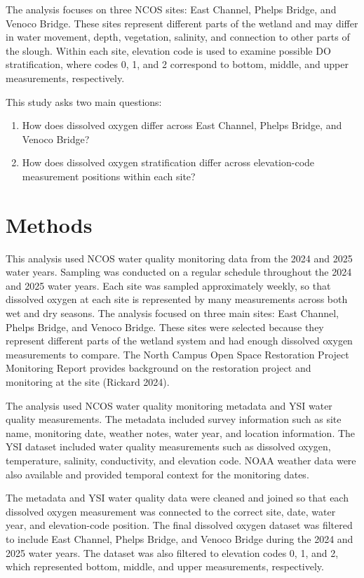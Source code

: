 \documentclass[
  letterpaper,
  DIV=11,
  numbers=noendperiod]{scrartcl}
\providecommand{\tightlist}{%
  \setlength{\itemsep}{0pt}\setlength{\parskip}{0pt}}
\begin{document}
The analysis focuses on three NCOS sites: East Channel, Phelps Bridge,
and Venoco Bridge. These sites represent different parts of the wetland
and may differ in water movement, depth, vegetation, salinity, and
connection to other parts of the slough. Within each site, elevation
code is used to examine possible DO stratification, where codes 0, 1,
and 2 correspond to bottom, middle, and upper measurements,
respectively.

This study asks two main questions:

\begin{enumerate}
\def\labelenumi{\arabic{enumi}.}
\tightlist
\item
  How does dissolved oxygen differ across East Channel, Phelps Bridge,
  and Venoco Bridge?
\item
  How does dissolved oxygen stratification differ across elevation-code
  measurement positions within each site?
\end{enumerate}

\section{Methods}\label{methods}

This analysis used NCOS water quality monitoring data from the 2024 and
2025 water years. Sampling was conducted on a regular schedule
throughout the 2024 and 2025 water years. Each site was sampled
approximately weekly, so that dissolved oxygen at each site is
represented by many measurements across both wet and dry seasons. The
analysis focused on three main sites: East Channel, Phelps Bridge, and
Venoco Bridge. These sites were selected because they represent
different parts of the wetland system and had enough dissolved oxygen
measurements to compare. The North Campus Open Space Restoration Project
Monitoring Report provides background on the restoration project and
monitoring at the site (Rickard 2024).

The analysis used NCOS water quality monitoring metadata and YSI water
quality measurements. The metadata included survey information such as
site name, monitoring date, weather notes, water year, and location
information. The YSI dataset included water quality measurements such as
dissolved oxygen, temperature, salinity, conductivity, and elevation
code. NOAA weather data were also available and provided temporal
context for the monitoring dates.

The metadata and YSI water quality data were cleaned and joined so that
each dissolved oxygen measurement was connected to the correct site,
date, water year, and elevation-code position. The final dissolved
oxygen dataset was filtered to include East Channel, Phelps Bridge, and
Venoco Bridge during the 2024 and 2025 water years. The dataset was also
filtered to elevation codes 0, 1, and 2, which represented bottom,
middle, and upper measurements, respectively.
\end{document}
